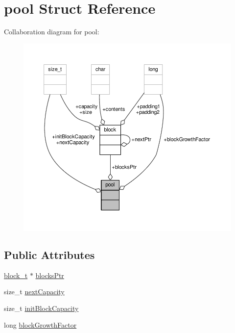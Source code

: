 \hypertarget{structpool}{\section{pool Struct Reference}
\label{structpool}
}


Collaboration diagram for pool\-:
\nopagebreak
\begin{figure}[H]
\begin{center}
\leavevmode
\includegraphics[width=350pt]{structpool__coll__graph}
\end{center}
\end{figure}
\subsection*{Public Attributes}
\begin{DoxyCompactItemize}
\item 
\hyperlink{memory_8c_a25a7929002e2ee0c9de180aafe65e3d3}{block\-\_\-t} $\ast$ \hyperlink{structpool_a1459a2771d2d6d0e733ee34e34e357a8}{blocks\-Ptr}
\item 
size\-\_\-t \hyperlink{structpool_aa0f4dd40fca5cddbc2f808243abec4ba}{next\-Capacity}
\item 
size\-\_\-t \hyperlink{structpool_a070e5eeea97285beeb96302e8ae39f06}{init\-Block\-Capacity}
\item 
long \hyperlink{structpool_ab15e0cf0b2ccfa137f98503466fa9f86}{block\-Growth\-Factor}
\end{DoxyCompactItemize}


